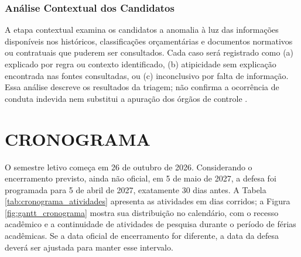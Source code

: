 \documentclass[
    12pt,               %
    openright,          %
    oneside,            %
    a4paper,            %
    chapter=TITLE,      %
    sumario=tradicional,%
    english,            %
    brazilian,          %
 ]{abntex2}
\begin{document}
\subsection{Análise Contextual dos Candidatos}\label{subsec:validacao_falsos_positivos}

A etapa contextual examina os candidatos a anomalia à luz das informações disponíveis nos históricos, classificações orçamentárias e documentos normativos ou contratuais que puderem ser consultados. Cada caso será registrado como (a) explicado por regra ou contexto identificado, (b) atipicidade sem explicação encontrada nas fontes consultadas, ou (c) inconclusivo por falta de informação. Essa análise descreve os resultados da triagem; não confirma a ocorrência de conduta indevida nem substitui a apuração dos órgãos de controle \cite{cavalcanti2014, nunes2021}.

\chapter{CRONOGRAMA}\label{sec:cronograma}
O semestre letivo começa em 26 de outubro de 2026. Considerando o encerramento previsto, ainda não oficial, em 5 de maio de 2027, a defesa foi programada para 5 de abril de 2027, exatamente 30 dias antes. A Tabela \ref{tab:cronograma_atividades} apresenta as atividades em dias corridos; a Figura \ref{fig:gantt_cronograma} mostra sua distribuição no calendário, com o recesso acadêmico e a continuidade de atividades de pesquisa durante o período de férias acadêmicas. Se a data oficial de encerramento for diferente, a data da defesa deverá ser ajustada para manter esse intervalo.
\end{document}
